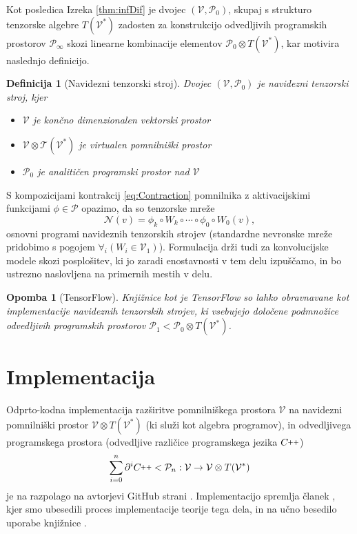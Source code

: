 \documentclass[a4paper, 12pt]{book}
\newcommand{\T}{\mathcal{T}}
\newcommand{\VV}{\mathcal{V}}
\newcommand{\NN}{\mathcal{N}}
\newcommand{\CC}{C\nolinebreak\hspace{-.05em}\raisebox{.4ex}{\tiny\bf +}\nolinebreak\hspace{-.10em}\raisebox{.4ex}{\tiny\bf +}}
\def\CC{{C\nolinebreak[4]\hspace{-.05em}\raisebox{.4ex}{\tiny\bf ++}}}
\newcommand{\dP}{\mathcal{P}}
\newcommand{\D}{\partial}
\newtheorem{opomba}{Opomba}[chapter]
\newtheorem{definicija}{Definicija}[chapter]
\begin{document}
Kot posledica Izreka \ref{thm:infDif} je dvojec $(\VV, \dP_0)$, skupaj s strukturo tenzorske algebre $T(\VV^*)$ zadosten za konstrukcijo odvedljivih programskih prostorov $\dP_\infty$ skozi linearne kombinacije elementov $\dP_0\otimes T(\VV^*)$, kar motivira naslednjo definicijo.
\begin{definicija}[Navidezni tenzorski stroj]
Dvojec $(\VV, \dP_0)$ je navidezni tenzorski stroj, kjer
\begin{itemize}
    \item
    $\VV$ je končno dimenzionalen vektorski prostor
    \item
    $\VV\otimes \T(\VV^*)$ je virtualen pomnilniški prostor
    \item
    $\dP_0$ je analitičen programski prostor nad $\VV$
    \end{itemize}
\end{definicija}

S kompozicijami kontrakcij \eqref{eq:Contraction} pomnilnika z aktivacijskimi funkcijami $\phi\in\dP$ opazimo, da so tenzorske mreže \cite{opCalProg}
\begin{equation} \label{eq:tenWord}
\NN(v)=\phi_k\circ W_k\circ\cdots\circ\phi_0\circ W_0(v),
\end{equation}
osnovni programi navideznih tenzorskih strojev (standardne nevronske mreže pridobimo s pogojem $\forall_i(W_i\in\VV_1)$). Formulacija drži tudi za konvolucijske modele skozi posplošitev, ki jo zaradi enostavnosti v tem delu izpuščamo, in bo ustrezno naslovljena na primernih mestih v delu.
\begin{opomba}[TensorFlow]
Knjižnice kot je TensorFlow \cite{TF} so lahko obravnavane kot implementacije navideznih tenzorskih strojev, ki vsebujejo določene podmnožice odvedljivih programskih prostorov $\dP_1<\dP_0\otimes T(\VV^*)$.
\end{opomba}

\section{Implementacija}\label{sec:implementacija}

Odprto-kodna implementacija razširitve pomnilniškega prostora $\VV$ na navidezni pomnilniški prostor $\VV\otimes T(\VV^*)$ (ki služi kot algebra programov), in odvedljivega programskega prostora (odvedljive različice programskega jezika $\CC$)
\begin{equation}
\sum\limits_{i=0}^n\D^i\CC<\dP_n:\VV\to\VV\otimes T(\VV^*)
\end{equation}
je na razpolago na avtorjevi GitHub strani \cite{dC++}. Implementacijo spremlja članek \cite{dC++Paper}, kjer smo ubesedili proces implementacije teorije tega dela, in na učno besedilo uporabe knjižnice \cite{dC++Man}.
\end{document}
